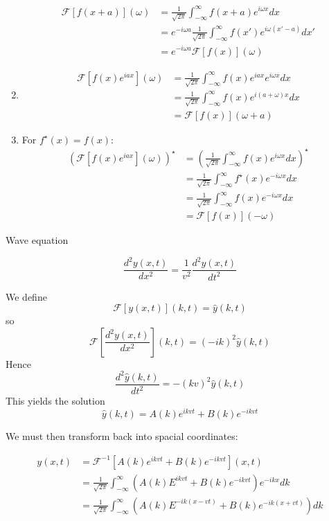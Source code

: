 \documentclass{../../physics_notes}
\begin{document}
\begin{enumerate}
{	\begin{align*}
	\mathcal{F}\left[f(x+a)\right](\omega) &= \frac{1}{\sqrt{2\pi}} \int_{-\infty}^\infty f(x+a)e^{i\omega x} dx \\
	&= e^{-i\omega a}\frac{1}{\sqrt{2\pi}} \int_{-\infty}^\infty f(x') e^{i\omega (x'-a)}dx' \\
	&= e^{-i\omega a}\mathcal{F}\left[f(x)\right]\left(\omega\right)
	\end{align*}}
	\item{
	\begin{align*}
	\mathcal{F}\left[f(x) e^{iax}\right](\omega) &= \frac{1}{\sqrt{2\pi}} \int_{-\infty}^\infty f(x)e^{iax}e^{i\omega x} dx \\
	&= \frac{1}{\sqrt{2\pi}} \int_{-\infty}^\infty f(x) e^{i(a + \omega)x}dx \\
	&=\mathcal{F}\left[f(x)\right]\left(\omega + a\right)
	\end{align*}}
	\item{For $f^\star(x) = f(x)$:
	\begin{align*}
	\left(\mathcal{F}\left[f(x) e^{iax}\right](\omega)\right)^\star &= \left(\frac{1}{\sqrt{2\pi}} \int_{-\infty}^\infty f(x)e^{i\omega x} dx \right)^\star\\
	&= \frac{1}{\sqrt{2\pi}} \int_{-\infty}^\infty f^\star(x)e^{-i\omega x} dx \\
	&= \frac{1}{\sqrt{2\pi}} \int_{-\infty}^\infty f(x)e^{-i\omega x} dx \\
	&=\mathcal{F}\left[f(x)\right](-\omega)
	\end{align*}}
\end{enumerate}

\begin{example}{Wave equation}

\begin{equation*}
\frac{d^2y(x,t)}{dx^2} = \frac{1}{v^2}\frac{d^2y(x,t)}{dt^2}
\end{equation*}

We define \[\mathcal{F}[y(x,t)](k,t) = \hat{y}(k,t)\] so \[\mathcal{F}\left[\frac{d^2y(x,t)}{dx^2}\right](k,t) = (-ik)^2\hat{y}(k,t)\] Hence \[\frac{d^2\hat{y}(k,t)}{dt^2} = -(kv)^2\hat{y}(k,t)\] This yields the solution \[\hat{y}(k,t) = A(k)e^{ikvt} + B(k)e^{-ikvt}\]

We must then transform back into spacial coordinates:

\begin{align*}
y(x,t) &= \mathcal{F}^{-1}\left[A(k)e^{ikvt} + B(k)e^{-ikvt}\right](x,t) \\
&= \frac{1}{\sqrt{2\pi}}\int_{-\infty}^\infty \left(A(k)E^{ikvt} + B(k)e^{-ikvt}\right)e^{-ikx} dk \\
&= \frac{1}{\sqrt{2\pi}}\int_{-\infty}^\infty \left(A(k)E^{-ik(x - vt)} + B(k)e^{-ik(x + vt)}\right)dk \\
\end{align*}
\end{example}
\end{document}
